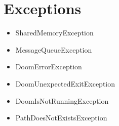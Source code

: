 \documentclass[english,bachelor,a4paper,twoside]{ppfcmthesis}
\begin{document}
\section{Exceptions}\label{sec:appendix_exception}
\begin{itemize}
    \item SharedMemoryException
    \item MessageQueueException
    \item DoomErrorException
    \item DoomUnexpectedExitException
    \item DoomIsNotRunningException
    \item PathDoesNotExistsException
\end{itemize}



\ppcolophon
\end{document}
